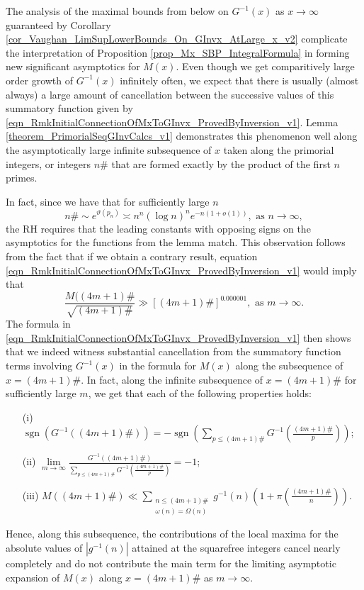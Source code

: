 \documentclass[11pt,reqno,a4letter]{article}
\numberwithin{figure}{section}
\numberwithin{table}{section}
\theoremstyle{plain}
\numberwithin{theorem}{section}
\theoremstyle{definition}
\begin{document}
The analysis of the maximal bounds from below on $G^{-1}(x)$ as 
$x \rightarrow \infty$ guaranteed by 
Corollary \ref{cor_Vaughan_LimSupLowerBounds_On_GInvx_AtLarge_x_v2} 
complicate the interpretation of 
Proposition \ref{prop_Mx_SBP_IntegralFormula} 
in forming new significant asymptotics for $M(x)$. 
Even though we get comparitively large order growth of 
$G^{-1}(x)$ infinitely often, 
we expect that there is usually (almost always) 
a large amount of cancellation between the successive 
values of this summatory function given by 
\eqref{eqn_RmkInitialConnectionOfMxToGInvx_ProvedByInversion_v1}. 
Lemma \ref{theorem_PrimorialSeqGInvCalcs_v1} 
demonstrates this phenomenon well along the asymptotically large infinite 
subsequence of $x$ taken along the primorial integers, or integers $n\#$ 
that are formed exactly by the product of the first $n$ primes. 

In fact, since we have that for sufficiently large $n$ 
\cite{DUSART-1999,DUSART-2010} 
\[
n\# \sim e^{\vartheta(p_n)} \asymp n^n (\log n)^n e^{-n(1+o(1))}, 
     \text{ as } n \rightarrow \infty, 
\]
the RH requires that the leading constants with opposing signs 
on the asymptotics for the functions from the lemma match. 
This observation follows from the fact that if we obtain a contrary result, 
equation \eqref{eqn_RmkInitialConnectionOfMxToGInvx_ProvedByInversion_v1} would imply that 
\[
\frac{M((4m+1)\#}{\sqrt{(4m+1)\#}} \gg \left[(4m+1)\#\right]^{0.000001}, 
     \text{ as } m \rightarrow \infty. 
\]
The formula in \eqref{eqn_RmkInitialConnectionOfMxToGInvx_ProvedByInversion_v1} 
then shows that we indeed witness substantial cancellation from the 
summatory function terms involving $G^{-1}(x)$ in the formula for $M(x)$ 
along the subsequence of $x = (4m+1)\#$. 
In fact, along the infinite subsequence of $x = (4m+1)\#$ for sufficiently large $m$, 
we get that each of the following properties holds: 
\begin{itemize} 
\item[(i)] $\operatorname{sgn}\left(G^{-1}((4m+1)\#)\right) = - \operatorname{sgn}\left( 
     \sum\limits_{p \leq (4m+1)\#} G^{-1}\left(\frac{(4m+1)\#}{p}\right)\right)$; 
\item[(ii)] $\lim\limits_{m \rightarrow \infty} \frac{G^{-1}((4m+1)\#)}{ 
     \sum\limits_{p \leq (4m+1)\#} G^{-1}\left(\frac{(4m+1)\#}{p}\right)} = -1$; 
\item[(iii)] $M((4m+1)\#) \ll \sum\limits_{\substack{n \leq (4m+1)\# \\ \omega(n)=\Omega(n)}} 
     g^{-1}(n) \left(1+\pi\left(\frac{(4m+1)\#}{n}\right)\right)$. 
\end{itemize} 
Hence, along this subsequence, the contributions of the 
local maxima for the absolute values of 
$|g^{-1}(n)|$ attained at the squarefree integers cancel nearly completely and do not 
contribute the main term for the limiting asymptotic expansion of $M(x)$ along 
$x = (4m+1)\#$ as $m \rightarrow \infty$. 
\end{document}
